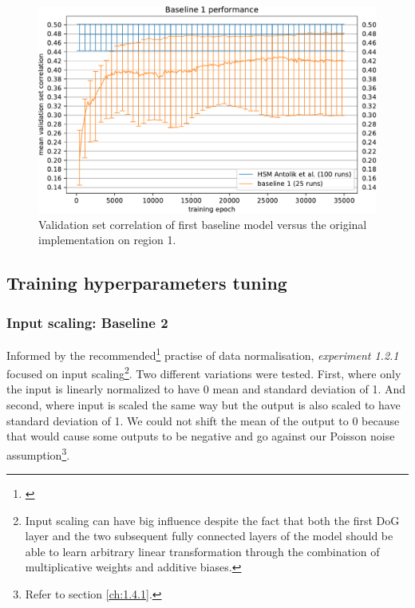 \begin{figure}[H]
    \centering
    \includegraphics[width=1\textwidth]{../figures/05_1_1_1}
    \caption[Experiment 1.1.1]{Validation set correlation of first baseline model versus the original \cite{antolik} implementation on region 1\protect\footnotemark.}
    \label{fig:5.1.1.1}
\end{figure}

\subsection{Training hyperparameters tuning}
\subsubsection{Input scaling: Baseline 2}
Informed by the recommended\footnote{\citep{10.5555/645754.668382}} practise of data normalisation, \emph{experiment 1.2.1} focused on input scaling\footnote{Input scaling can have big influence despite the fact that both the first DoG layer and the two subsequent fully connected layers of the model should be able to learn arbitrary linear transformation through the combination of multiplicative weights and additive biases.}. Two different variations were tested. First, where only the input is linearly normalized to have 0 mean and standard deviation of 1. And second, where input is scaled the same way but the output is also scaled to have standard deviation of 1. We could not shift the mean of the output to 0 because that would cause some outputs to be negative and go against our Poisson noise assumption\footnote{Refer to section \ref{ch:1.4.1}.}.

